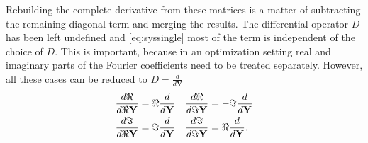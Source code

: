 Rebuilding the complete derivative from these matrices is a matter of subtracting the remaining diagonal term and merging the results.
The differential operator $D$ has been left undefined and \autoref{eq:syssingle} most of the term is independent of the choice of $D$.
This is important, because in an optimization setting real and imaginary parts of the Fourier coefficients need to be treated separately.
However, all these cases can be reduced to $D = \frac{d}{d \mathbf Y}$
\begin{align*}
	\frac{d \Re}{d\Re \mathbf Y} = \Re \frac{d}{d \mathbf Y} &&& \frac{d \Re}{d\Im \mathbf Y} = -\Im \frac{d}{d \mathbf Y}\\
	\frac{d \Im}{d\Re \mathbf Y} = \Im \frac{d}{d \mathbf Y} &&& \frac{d \Im}{d\Im \mathbf Y} = \Re \frac{d}{d \mathbf Y} \text.
\end{align*}
